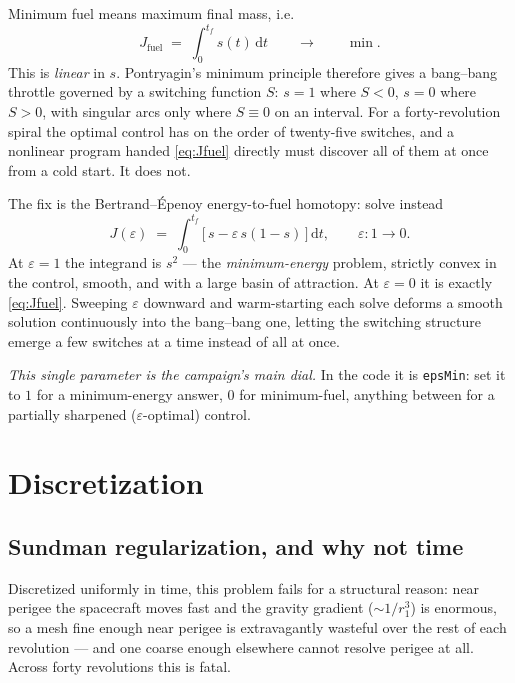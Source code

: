 \documentclass[11pt]{article}
\newcommand{\ud}{\,\mathrm{d}}
\begin{document}
Minimum fuel means maximum final mass, i.e.
\begin{equation}
J_{\text{fuel}} \;=\; \int_0^{t_f} s(t)\ud t
\qquad\longrightarrow\qquad \min .
\label{eq:Jfuel}
\end{equation}
This is \emph{linear} in $s$. Pontryagin's minimum principle therefore gives a
bang--bang throttle governed by a switching function $S$: $s=1$ where $S<0$,
$s=0$ where $S>0$, with singular arcs only where $S\equiv0$ on an interval. For
a forty-revolution spiral the optimal control has on the order of twenty-five
switches, and a nonlinear program handed \eqref{eq:Jfuel} directly must
discover all of them at once from a cold start. It does not.

The fix is the Bertrand--\'Epenoy energy-to-fuel homotopy: solve instead
\begin{equation}
J(\varepsilon) \;=\; \int_0^{t_f}\Big[\,s - \varepsilon\, s(1-s)\,\Big]\ud t ,
\qquad \varepsilon: 1 \to 0 .
\label{eq:homotopy}
\end{equation}
At $\varepsilon=1$ the integrand is $s^2$ --- the \emph{minimum-energy} problem,
strictly convex in the control, smooth, and with a large basin of attraction.
At $\varepsilon=0$ it is exactly \eqref{eq:Jfuel}. Sweeping $\varepsilon$
downward and warm-starting each solve deforms a smooth solution continuously
into the bang--bang one, letting the switching structure emerge a few switches
at a time instead of all at once.

\emph{This single parameter is the campaign's main dial.} In the code it is
\texttt{epsMin}: set it to $1$ for a minimum-energy answer, $0$ for
minimum-fuel, anything between for a partially sharpened
($\varepsilon$-optimal) control.

\section{Discretization}

\subsection{Sundman regularization, and why not time}

Discretized uniformly in time, this problem fails for a structural reason: near
perigee the spacecraft moves fast and the gravity gradient
($\sim 1/r_1^3$) is enormous, so a mesh fine enough near perigee is
extravagantly wasteful over the rest of each revolution --- and one coarse
enough elsewhere cannot resolve perigee at all. Across forty revolutions this
is fatal.
\end{document}

